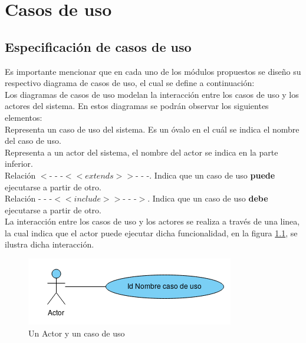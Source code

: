 \chapter{Casos de uso}
\label{anexos:cus}

\section{Especificación de casos de uso}
Es importante mencionar que en cada uno de los módulos propuestos se diseño su respectivo diagrama de casos de uso, el cual se define a continuación:\\

Los diagramas de casos de uso modelan la interacción entre los casos de uso y los actores del sistema. En estos diagramas se podrán observar los siguientes elementos:\\

	\UCsist{ } Representa un caso de uso del sistema. Es un óvalo en el cuál se indica el nombre del caso de uso.\\
	
	\UCactor{ } Representa a un actor del sistema, el nombre del actor se indica en la parte inferior.\\
	
	Relación $<$- - -$<<extends>>$- - -. Indica que un caso de uso \textbf{puede} ejecutarse a partir de otro.\\
	
	Relación - - -$<<include>>$- - -$>$. Indica que un caso de uso \textbf{debe} ejecutarse a partir de otro.\\

La interacción entre los casos de uso y los actores se realiza a través de una linea, la cual indica que el actor puede ejecutar dicha funcionalidad, en la figura \ref{fig:acUC}, se ilustra dicha interacción.

\begin{figure}[hbtp!]
	\begin{center}
		\includegraphics[width=.4\textwidth]{LIT/ActorUC.png}
	\end{center}
	\caption{Un Actor y un caso de uso}
	\label{fig:acUC}
\end{figure}

